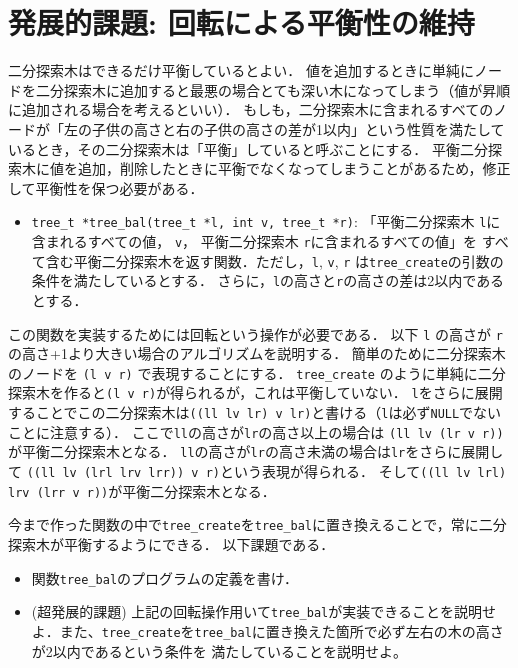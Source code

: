 \documentclass[a4paper,twoside,onecolumn,openany,article]{memoir}
\theoremstyle{remark}
\begin{document}
\section{発展的課題: 回転による平衡性の維持}
二分探索木はできるだけ平衡しているとよい．
値を追加するときに単純にノードを二分探索木に追加すると最悪の場合とても深い木になってしまう（値が昇順に追加される場合を考えるといい）．
もしも，二分探索木に含まれるすべてのノードが「左の子供の高さと右の子供の高さの差が1以内」という性質を満たしているとき，その二分探索木は「平衡」していると呼ぶことにする．
平衡二分探索木に値を追加，削除したときに平衡でなくなってしまうことがあるため，修正して平衡性を保つ必要がある．
\begin{itemize}
\item \texttt{tree\_t *tree\_bal(tree\_t *l, int v, tree\_t *r)}: 「平衡二分探索木 \texttt{l}に含まれるすべての値， \texttt{v}， 平衡二分探索木 \texttt{r}に含まれるすべての値」を
すべて含む平衡二分探索木を返す関数．ただし，\texttt{l}, \texttt{v}, \texttt{r} は\texttt{tree\_create}の引数の条件を満たしているとする．
さらに，\texttt{l}の高さと\texttt{r}の高さの差は2以内であるとする．
\end{itemize}
この関数を実装するためには回転という操作が必要である．
以下 \texttt{l} の高さが \texttt{r} の高さ+1より大きい場合のアルゴリズムを説明する．
簡単のために二分探索木のノードを \texttt{(l v r)} で表現することにする．
\texttt{tree\_create} のように単純に二分探索木を作ると\texttt{(l v r)}が得られるが，これは平衡していない．
\texttt{l}をさらに展開することでこの二分探索木は\texttt{((ll lv lr) v lr)}と書ける（\texttt{l}は必ず\texttt{NULL}でないことに注意する）．
ここで\texttt{ll}の高さが\texttt{lr}の高さ以上の場合は
\texttt{(ll lv (lr v r))}が平衡二分探索木となる．
\texttt{ll}の高さが\texttt{lr}の高さ未満の場合は\texttt{lr}をさらに展開して
\texttt{((ll lv (lrl lrv lrr)) v r)}という表現が得られる．
そして\texttt{((ll lv lrl) lrv (lrr v r))}が平衡二分探索木となる．

今まで作った関数の中で\texttt{tree\_create}を\texttt{tree\_bal}に置き換えることで，常に二分探索木が平衡するようにできる．
以下課題である．
\begin{itemize}
\item 関数\texttt{tree\_bal}のプログラムの定義を書け．
\item (超発展的課題) 上記の回転操作用いて\texttt{tree\_bal}が実装できることを説明せよ．また、\texttt{tree\_create}を\texttt{tree\_bal}に置き換えた箇所で必ず左右の木の高さが2以内であるという条件を
満たしていることを説明せよ。
\end{itemize}
\end{document}
